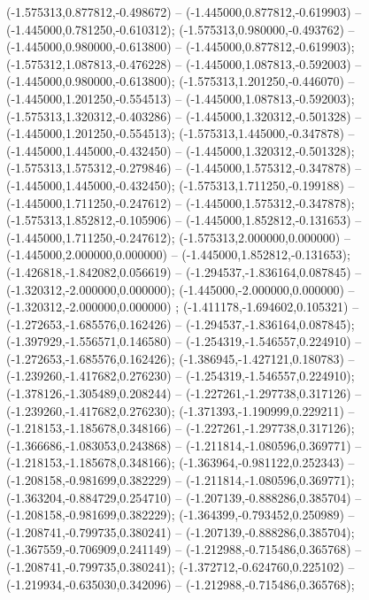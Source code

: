  (-1.575313,0.877812,-0.498672) -- (-1.445000,0.877812,-0.619903) -- (-1.445000,0.781250,-0.610312);
 (-1.575313,0.980000,-0.493762) -- (-1.445000,0.980000,-0.613800) -- (-1.445000,0.877812,-0.619903);
 (-1.575312,1.087813,-0.476228) -- (-1.445000,1.087813,-0.592003) -- (-1.445000,0.980000,-0.613800);
 (-1.575313,1.201250,-0.446070) -- (-1.445000,1.201250,-0.554513) -- (-1.445000,1.087813,-0.592003);
 (-1.575313,1.320312,-0.403286) -- (-1.445000,1.320312,-0.501328) -- (-1.445000,1.201250,-0.554513);
 (-1.575313,1.445000,-0.347878) -- (-1.445000,1.445000,-0.432450) -- (-1.445000,1.320312,-0.501328);
 (-1.575313,1.575312,-0.279846) -- (-1.445000,1.575312,-0.347878) -- (-1.445000,1.445000,-0.432450);
 (-1.575313,1.711250,-0.199188) -- (-1.445000,1.711250,-0.247612) -- (-1.445000,1.575312,-0.347878);
 (-1.575313,1.852812,-0.105906) -- (-1.445000,1.852812,-0.131653) -- (-1.445000,1.711250,-0.247612);
 (-1.575313,2.000000,0.000000) -- (-1.445000,2.000000,0.000000) -- (-1.445000,1.852812,-0.131653);
 (-1.426818,-1.842082,0.056619) -- (-1.294537,-1.836164,0.087845) -- (-1.320312,-2.000000,0.000000);
 (-1.445000,-2.000000,0.000000) -- (-1.320312,-2.000000,0.000000) ;
 (-1.411178,-1.694602,0.105321) -- (-1.272653,-1.685576,0.162426) -- (-1.294537,-1.836164,0.087845);
 (-1.397929,-1.556571,0.146580) -- (-1.254319,-1.546557,0.224910) -- (-1.272653,-1.685576,0.162426);
 (-1.386945,-1.427121,0.180783) -- (-1.239260,-1.417682,0.276230) -- (-1.254319,-1.546557,0.224910);
 (-1.378126,-1.305489,0.208244) -- (-1.227261,-1.297738,0.317126) -- (-1.239260,-1.417682,0.276230);
 (-1.371393,-1.190999,0.229211) -- (-1.218153,-1.185678,0.348166) -- (-1.227261,-1.297738,0.317126);
 (-1.366686,-1.083053,0.243868) -- (-1.211814,-1.080596,0.369771) -- (-1.218153,-1.185678,0.348166);
 (-1.363964,-0.981122,0.252343) -- (-1.208158,-0.981699,0.382229) -- (-1.211814,-1.080596,0.369771);
 (-1.363204,-0.884729,0.254710) -- (-1.207139,-0.888286,0.385704) -- (-1.208158,-0.981699,0.382229);
 (-1.364399,-0.793452,0.250989) -- (-1.208741,-0.799735,0.380241) -- (-1.207139,-0.888286,0.385704);
 (-1.367559,-0.706909,0.241149) -- (-1.212988,-0.715486,0.365768) -- (-1.208741,-0.799735,0.380241);
 (-1.372712,-0.624760,0.225102) -- (-1.219934,-0.635030,0.342096) -- (-1.212988,-0.715486,0.365768);
